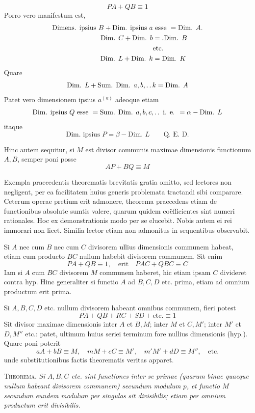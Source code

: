 %
\[
PA+QB\equiv1
\]
Porro vero manifestum est,
\[
\begin{aligned}
\text{Dimens. ipsius }B+\text{Dim. ipsius }a&\text{ esse }=\text{Dim. }A.\\
\text{Dim. }C+\text{Dim. }b&=\mathbin{.}\text{Dim. }B\\
&\text{etc.}\\
\text{Dim. }L+\text{Dim. }k&=\text{Dim. }K
\end{aligned}
\]
Quare
\[
\text{Dim. }L+\text{Sum. Dim. }a,b,\mathinner{.\,.} k=\text{Dim. }A
\]
Patet vero dimensionem ipsius $a^{(\kappa)}$ adeoque etiam
\[
\text{Dim. ipsius }Q\text{ esse }=\text{Sum. Dim. }a,b,c,\mathinner{.\,.}\text{ i. e. }=\alpha-\text{Dim. }L
\]
itaque
\[
\text{Dim. ipsius }P=\beta-\text{Dim. }L\qquad\text{Q. E. D.}
\]

Hinc autem sequitur, si $M$ est divisor communis maximae dimensionis functionum $A,B$, semper poni posse
\[
AP+BQ\equiv M
\]

Exempla praecedentis theorematis brevitatis gratia omitto, sed lectores non negligent, per ea facilitatem huius generis problemata tractandi sibi comparare. Ceterum operae pretium erit admonere, theorema praecedens etiam de functionibus absolute sumtis valere, quarum quidem coëfficientes sint numeri rationales. Hoc ex demonstrationis modo per se elucebit. Nobis autem ei rei immorari non licet. Similia lector etiam non admonitus in sequentibus observabit.

Si $A$ nec cum $B$ nec cum $C$ divisorem ullius dimensionis communem habeat, etiam cum producto $BC$ nullum habebit divisorem communem. Sit enim
\[
PA+QB\equiv1,\quad\text{erit}\quad PAC+QBC\equiv C
\]
Iam si $A$ cum $BC$ divisorem $M$ communem haberet, hic etiam ipsam $C$ divideret contra hyp. Hinc generaliter si functio $A$ ad $B,C,D$ etc. prima, etiam ad omnium productum erit prima.

Si $A,B,C,D$ etc. nullum divisorem habeant omnibus communem, fieri potest
%
\[
PA+QB+RC+SD+\text{etc.}\equiv1
\]
Sit divisor maximae dimensionis inter $A$ et $B,M$; inter $M$ et $C,M'$; inter $M'$ et $D,M''$ etc.: patet, ultimum huius seriei terminum fore nullius dimensionis (hyp.). Quare poni poterit
\[
aA+bB\equiv M,\quad mM+cC\equiv M',\quad m'M'+dD\equiv M'',\quad\text{etc.}
\]
unde substitutionibus factis theorematis veritas apparet.

\textsc{Theorema.} \emph{Si $A,B,C$ etc. sint functiones inter se primae (quarum binae quaeque nullum habeant divisorem communem) secundum modulum $p$, et functio $M$ secundum eundem modulum per singulas sit divisibilis; etiam per omnium productum erit divisibilis.}


